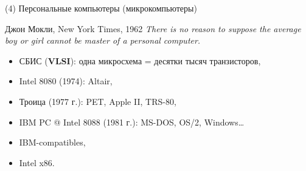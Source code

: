 \begin{frame}{(4) Персональные компьютеры (микрокомпьютеры)}
\begin{block}{Джон Мокли, New York Times, 1962}
    \textit{There is no reason to suppose the average boy or girl cannot be master of a personal computer.}
\end{block}
\pause
\begin{itemize}
    \item СБИС (\textbf{VLSI}): одна микросхема = десятки тысяч транзисторов,
    \item Intel 8080 (1974): Altair,
    \item Троица (1977 г.): PET, Apple II, TRS-80,
    \item IBM PC @ Intel 8088 (1981 г.): MS-DOS, OS/2, Windows…
    \item IBM-compatibles,
    \item Intel x86.
\end{itemize}
\end{frame}


